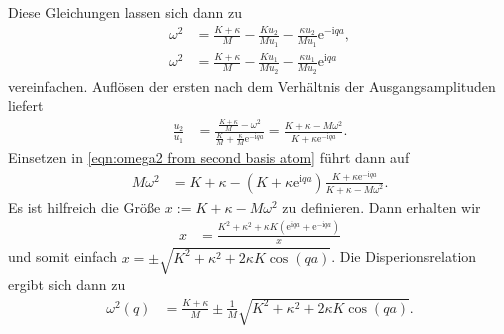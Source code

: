 \documentclass[english, parskip=full]{scrartcl}
\newcommand{\kla}{}
\renewcommand{\i}{\text{i}}
\newcommand{\e}{\text{e}}
\begin{document}
Diese Gleichungen lassen sich dann zu
\begin{align}
\omega^2 &= \frac{K+\kappa}{M} - \frac{Ku_2}{Mu_1} - \frac{\kappa u_2}{Mu_1}\e^{-\i qa},\label{eqn:omega2 from first basis atom} \\
\omega^2 &= \frac{K+\kappa}{M} - \frac{Ku_1}{Mu_2} - \frac{\kappa u_1}{Mu_2}\e^{\i qa} \label{eqn:omega2 from second basis atom}
\end{align}
vereinfachen.
Auflösen der ersten nach dem Verhältnis der Ausgangsamplituden liefert
\begin{align}
\frac{u_2}{u_1} &= \frac{\frac{K+\kappa}{M} - \omega^2}{\frac{K}{M} + \frac{\kappa}{M}\e^{-\i qa}} = \frac{K+\kappa - M\omega^2}{K + \kappa \e^{-\i qa}}.
\end{align}
Einsetzen in \autoref{eqn:omega2 from second basis atom} führt dann auf
\begin{align}
M\omega^2 &= K+\kappa - \kla\left( K+\kappa\e^{\i qa} \right) \frac{K + \kappa \e^{-\i qa}}{K+\kappa - M\omega^2}.
\end{align}
Es ist hilfreich die Größe $x := K+\kappa -M\omega^2$ zu definieren.
Dann erhalten wir
\begin{align}
x &= \frac{K^2 + \kappa^2 + \kappa K (\e^{\i qa} + \e^{-\i qa})}{x}
\end{align}
und somit einfach $x = \pm \sqrt{K^2 + \kappa^2 + 2\kappa K \cos(qa)}$.
Die Disperionsrelation ergibt sich dann zu
\begin{align}
\omega^2(q) &= \frac{K+\kappa}{M} \pm \frac{1}{M} \sqrt{K^2 + \kappa^2 + 2\kappa K \cos(qa)}. \label{eqn:dispersion kette}
\end{align}
\end{document}
